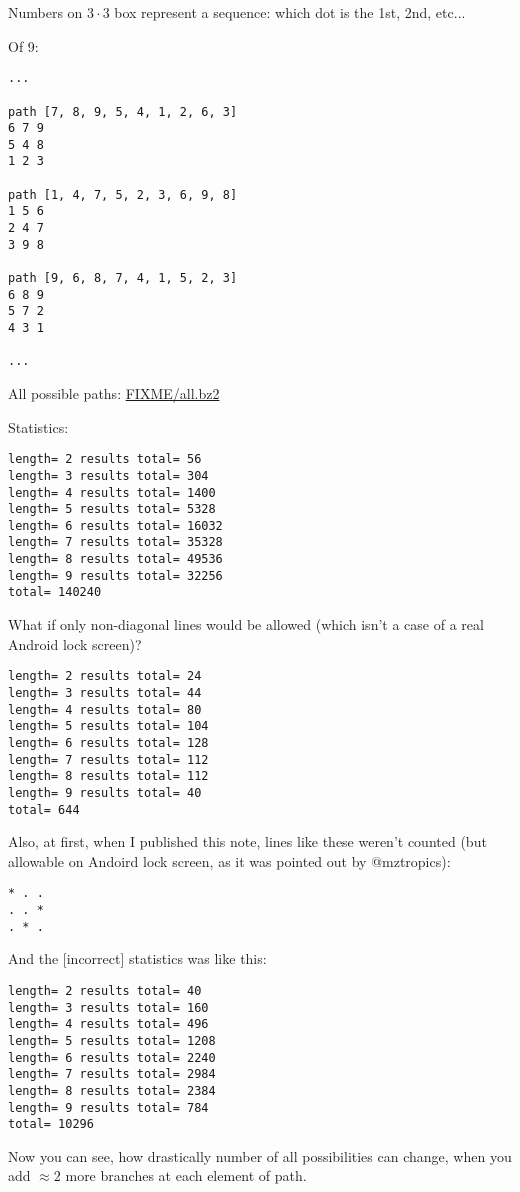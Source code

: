 Numbers on $3 \cdot 3$ box represent a sequence: which dot is the 1st, 2nd, etc...

Of 9:

\begin{lstlisting}
...

path [7, 8, 9, 5, 4, 1, 2, 6, 3]
6 7 9
5 4 8
1 2 3

path [1, 4, 7, 5, 2, 3, 6, 9, 8]
1 5 6
2 4 7
3 9 8

path [9, 6, 8, 7, 4, 1, 5, 2, 3]
6 8 9
5 7 2
4 3 1

...
\end{lstlisting}

All possible paths: \url{FIXME/all.bz2}

Statistics:

\begin{lstlisting}
length= 2 results total= 56
length= 3 results total= 304
length= 4 results total= 1400
length= 5 results total= 5328
length= 6 results total= 16032
length= 7 results total= 35328
length= 8 results total= 49536
length= 9 results total= 32256
total= 140240
\end{lstlisting}

What if only non-diagonal lines would be allowed (which isn't a case of a real Android lock screen)?

\begin{lstlisting}
length= 2 results total= 24
length= 3 results total= 44
length= 4 results total= 80
length= 5 results total= 104
length= 6 results total= 128
length= 7 results total= 112
length= 8 results total= 112
length= 9 results total= 40
total= 644
\end{lstlisting}

Also, at first, when I published this note, lines like these weren't counted (but allowable on Andoird lock screen, as it was pointed out by @mztropics):

\begin{lstlisting}
* . .
. . *
. * .
\end{lstlisting}

And the [incorrect] statistics was like this:

\begin{lstlisting}
length= 2 results total= 40
length= 3 results total= 160
length= 4 results total= 496
length= 5 results total= 1208
length= 6 results total= 2240
length= 7 results total= 2984
length= 8 results total= 2384
length= 9 results total= 784
total= 10296
\end{lstlisting}

Now you can see, how drastically number of all possibilities can change, when you add $\approx 2$ more branches at each element of path.

